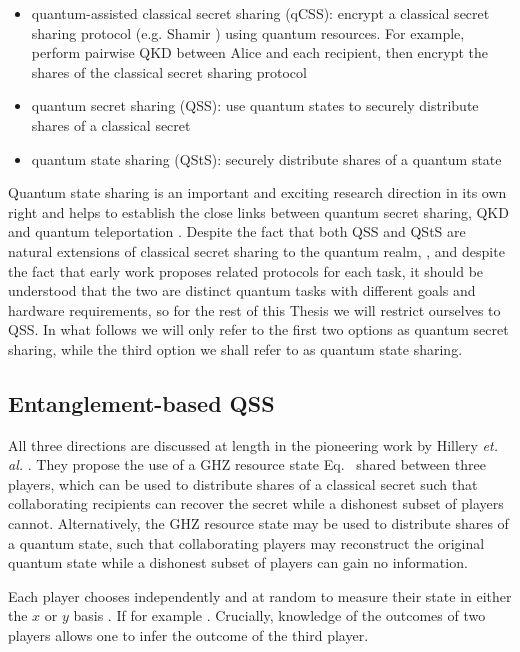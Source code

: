 \begin{itemize}
\item quantum-assisted classical secret sharing (qCSS): encrypt a classical secret sharing protocol (e.g. Shamir ) using quantum resources. For example, perform pairwise QKD between Alice and each recipient, then encrypt the shares of the classical secret sharing protocol
\item quantum secret sharing (QSS): use quantum states to securely distribute shares of a classical secret
\item quantum state sharing (QStS): securely distribute shares of a quantum state
\end{itemize}

Quantum state sharing is an important and exciting research direction in its own right and helps to establish the close links between quantum secret sharing, QKD and quantum teleportation . Despite the fact that both QSS and QStS are natural extensions of classical secret sharing to the quantum realm, , and despite the fact that early work  proposes related protocols for each task, it should be understood that the two are distinct quantum tasks with different goals and hardware requirements, so for the rest of this Thesis we will restrict ourselves to QSS. In what follows we will only refer to the first two options as quantum secret sharing, while the third option we shall refer to as quantum state sharing.

\subsection{Entanglement-based QSS}

All three directions are discussed at length in the pioneering work by Hillery \emph{et. al.} \cite{Hillery1999}. They propose the use of a GHZ resource state Eq.~ shared between three players, which can be used to distribute shares of a classical secret such that collaborating recipients can recover the secret while a dishonest subset of players cannot. Alternatively, the GHZ resource state may be used to distribute shares of a quantum state, such that collaborating players may reconstruct the original quantum state while a dishonest subset of players can gain no information.

Each player chooses independently and at random to measure their state in either the $x$ or $y$ basis . If for example .  Crucially, knowledge of the outcomes of two players allows one to infer the outcome of the third player.  

